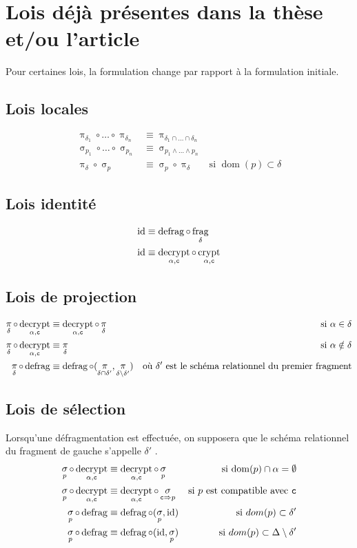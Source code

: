 \documentclass[french]{article}
\DeclareMathOperator{\proj}{\pi}
\DeclareMathOperator{\sel}{\sigma}
\DeclareMathOperator{\frag}{frag}
\DeclareMathOperator{\defrag}{defrag}
\DeclareMathOperator{\crypt}{crypt}
\DeclareMathOperator{\decrypt}{decrypt}
\DeclareMathOperator{\id}{id}
\DeclareMathOperator{\dom}{dom}
\newcommand\typeT[1]{\text{\ttfamily #1}}
\newcommand{\decryptArgs}[2]{\decrypt_{#1 , \typeT{#2}}}
\newcommand{\cryptArgs}[2]{\crypt_{#1 , \typeT{#2}}}
\newcommand{\projDelta}{\proj_{\delta}}
\newcommand{\selP}{\sel_p}
\newcommand{\decryptCAlpha}{\decryptArgs{\alpha}{c}}
\newcommand{\fragDelta}{\frag_{\delta}}
\begin{document}
\section*{Lois déjà présentes dans la thèse et/ou l'article}
Pour certaines lois, la formulation change par rapport à la formulation initiale.
\subsection*{Lois locales}
\begin{align}
	\proj_{\delta_1}\circ \dots \circ \proj_{\delta_n} 
	&\equiv \proj_{\delta_1 \cap \dots \cap \delta_n} \\
	\sel_{p_1} \circ \dots \circ \sel_{p_n}
	&\equiv \sel_{p_1 \wedge \dots \wedge p_n} \\
	\projDelta \circ \selP
	& \equiv \selP \circ \projDelta
	& \text{si $\dom(p) \subset \delta$}
\end{align}
\subsection*{Lois identité}
\begin{align}
	\id & \equiv \defrag \circ \fragDelta \\
	\id & \equiv \decryptArgs{\alpha}{c} \circ \cryptArgs{\alpha}{c}
\end{align}

\subsection*{Lois de projection}
\begin{align}
\projDelta \circ \decryptArgs{\alpha}{c}
& \equiv \decryptArgs{\alpha}{c} \circ \projDelta
&\text{si $\alpha \in \delta$}\\
\projDelta \circ \decryptArgs{\alpha}{c}
& \equiv \projDelta
&\text{si $\alpha \notin \delta$} \\
\projDelta \circ \defrag
& \equiv \defrag \circ (\proj_{\delta \cap \delta'}, \proj_{\delta \setminus \delta'})
& \text{où $\delta'$ est le schéma relationnel du premier fragment}
\end{align}

\subsection*{Lois de sélection}
Lorsqu'une défragmentation est effectuée, on supposera que le schéma relationnel
du fragment de gauche s'appelle $\delta'$ .
\begin{align}
\selP \circ \decryptCAlpha 
& \equiv \decryptCAlpha \circ \selP
& \text{si $\dom(p) \cap \alpha = \emptyset$} \\
\selP \circ \decryptCAlpha 
& \equiv \decryptCAlpha \circ \sel_{\typeT{c} \Rightarrow p}
& \text{si $p$  est compatible avec $\typeT{c}$} \\
\selP \circ \defrag 
& \equiv \defrag \circ (\selP, \id)
& \text{si $dom(p) \subset \delta'$} \\
\selP \circ \defrag 
& \equiv \defrag \circ (\id, \selP)
& \text{si $dom(p) \subset \Delta \setminus \delta'$}
\end{align}
 
\end{document}
